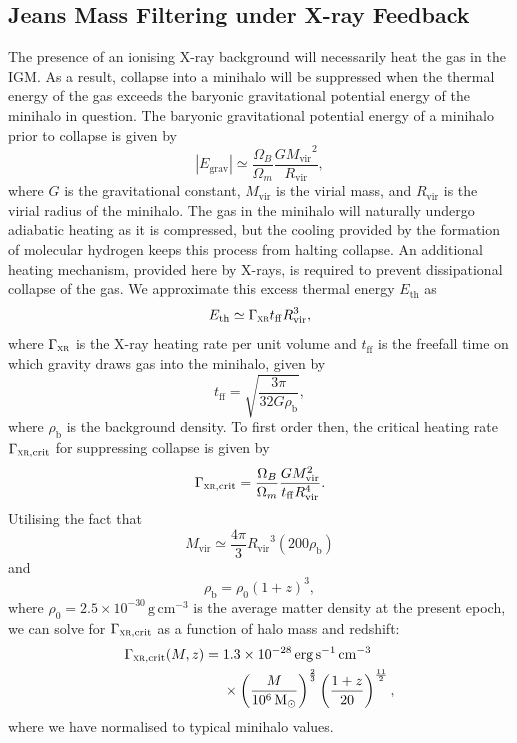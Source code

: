 \documentclass{thesis}
\newcommand{\s}{\ensuremath{\,\mathrm{s}}\xspace}
\newcommand{\cc}{\ensuremath{\,\mathrm{cm}^{-3}}\xspace}
\newcommand{\msun}{\ensuremath{\,\mathrm{M}_{\odot}}\xspace}
\newcommand{\erg}{\ensuremath{\,\mathrm{erg}}\xspace}
\newcommand{\tff}{\ensuremath{{t}_{\mathrm{ff}}}\xspace}
\newcommand{\rvir}{\ensuremath{{R}_{\mathrm{vir}}}\xspace}
\newcommand{\mvir}{\ensuremath{{M}_{\mathrm{vir}}}\xspace}
\newcommand{\egrav}{\ensuremath{{E}_{\mathrm{grav}}}\xspace}
\newcommand{\etherm}{\ensuremath{{E}_{\mathrm{th}}}\xspace}
\newcommand{\gxr}{\ensuremath{\Gamma_{\textsc{xr}}}\xspace}
\newcommand{\gcrit}{\ensuremath{\Gamma_{\textsc{xr}, \mathrm{crit}}}\xspace}
\begin{document}
\subsection{Jeans Mass Filtering under X-ray Feedback}
\label{filtering}
The presence of an ionising X-ray background will necessarily heat the
gas in the IGM.  As a result, collapse into a minihalo will be
suppressed when the thermal energy of the gas exceeds the
baryonic gravitational potential energy of the minihalo in question.  The
baryonic gravitational potential energy of a minihalo prior to collapse is given by
\begin{equation}
  \left|\egrav\right| \simeq \frac{\Omega_B}{\Omega_m} \frac{G \mvir^2}{\rvir},
\end{equation}
where $G$ is the gravitational constant, \mvir is the virial mass, and \rvir is the virial radius of the minihalo.
The gas in the minihalo will naturally undergo adiabatic heating as it
is compressed, but the cooling provided by the formation of molecular hydrogen keeps this process from halting collapse.  An additional heating
mechanism, provided here by X-rays, is required to prevent dissipational collapse of the gas.  We approximate this
excess thermal energy \etherm as
\begin{equation}
  \etherm \simeq \gxr \tff \rvir^3,
\end{equation}
where \gxr is the X-ray heating rate per unit volume and \tff is the freefall
time on which gravity draws gas into the minihalo, given by
\begin{equation}
  \tff = \sqrt{\frac{3\pi}{32 G \rho_{\mathrm b}}},
\end{equation}
where $\rho_{\mathrm b}$ is the background density. To first order then, the critical heating rate \gcrit for suppressing collapse  is  given by
\begin{equation}
  \gcrit = \frac{\Omega_B}{\Omega_m} \frac{G \mvir^2}{\tff \rvir^4}.
\end{equation}
Utilising the fact that 
\begin{equation}
  \mvir \simeq \frac{4\pi}{3}\rvir^3 (200 \rho_{\mathrm b})
\end{equation} 
and
\begin{equation}
  \rho_{\mathrm b} = \rho_0 (1+z)^3,
\end{equation}
where $\rho_0 = 2.5\times10^{-30}\,{\mathrm g}\cc$ is the average matter density at the present epoch, we can solve for \gcrit as a function of halo mass and redshift:
\begin{equation}
  \begin{split}
    \gcrit(M,z) = \; & 1.3\times10^{-28} \erg\s^{-1}\cc \\  
    &\times \left(\frac{M}{10^6\msun}\right)^{\frac{2}{3}} 
    \left(\frac{1+z}{20}\right)^{\frac{11}{2}},
  \end{split}
\end{equation}
where we have normalised to typical minihalo values.  
\end{document}
